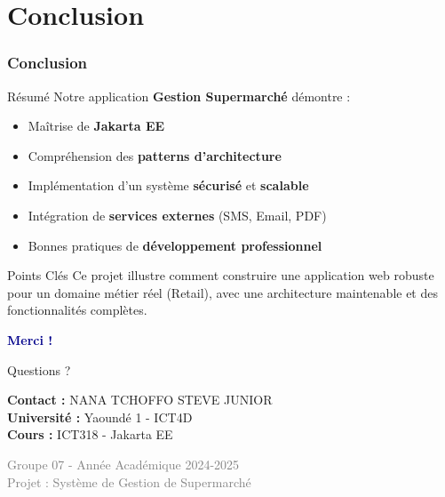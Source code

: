 \documentclass[11pt, aspectratio=169]{beamer}
\begin{document}
\section{Conclusion}

\begin{frame}
    \frametitle{Conclusion}
    
    \begin{block}{Résumé}
        Notre application \textbf{Gestion Supermarché} démontre :
        \begin{itemize}
            \item[\faCheckCircle] Maîtrise de \textbf{Jakarta EE}
            \item[\faCheckCircle] Compréhension des \textbf{patterns d'architecture}
            \item[\faCheckCircle] Implémentation d'un système \textbf{sécurisé} et \textbf{scalable}
            \item[\faCheckCircle] Intégration de \textbf{services externes} (SMS, Email, PDF)
            \item[\faCheckCircle] Bonnes pratiques de \textbf{développement professionnel}
        \end{itemize}
    \end{block}
    
    \vspace{1cm}
    
    \begin{alertblock}{Points Clés}
        Ce projet illustre comment construire une application web robuste
        pour un domaine métier réel (Retail), avec une architecture maintenable
        et des fonctionnalités complètes.
    \end{alertblock}
\end{frame}

\begin{frame}[plain]
    \begin{center}
        \vspace{2cm}
        {\Huge \textbf{\textcolor{DarkBlue}{Merci !}}}
        
        \vspace{1.5cm}
        
        {\Large Questions ?}
        
        \vspace{2cm}
        
        {\small
            \textbf{Contact :} NANA TCHOFFO STEVE JUNIOR \\
            \textbf{Université :} Yaoundé 1 - ICT4D \\
            \textbf{Cours :} ICT318 - Jakarta EE
        }
        
        \vspace{2cm}
        
        {\footnotesize \textcolor{gray}{
            Groupe 07 - Année Académique 2024-2025 \\
            Projet : Système de Gestion de Supermarché
        }}
    \end{center}
\end{frame}
\end{document}
